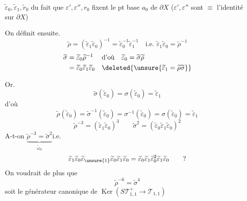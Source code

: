 $\widetilde\varepsilon_0,\widetilde\varepsilon_1,\widetilde r_0$  du fait que $\varepsilon',\varepsilon'',r_0$ fixent le pt base $a_0$ de $\partial X$ ($\varepsilon',\varepsilon''$ sont $\equiv$ l'identité sur $\partial X$)

On définit ensuite.
\[
\widetilde\rho=(\widetilde\varepsilon_1\widetilde\varepsilon_0)^{-1}
=\widetilde\varepsilon_0^{-1}\widetilde\varepsilon_1^{-1}
\quad\text{i.e. }\widetilde\varepsilon_1\widetilde\varepsilon_0=\widetilde\rho^{-1}
\]
\[
\begin{aligned}
\widetilde\sigma&=\widetilde\varepsilon_0\widetilde\rho^{-1}&&\text{d'où}\quad\widetilde\varepsilon_0=\widetilde\sigma\widetilde\rho\\
&=\widetilde\varepsilon_0\widetilde\varepsilon_1\widetilde\varepsilon_0
&&\deleted{\unsure{\widetilde\varepsilon_1=\widetilde\rho\widetilde\sigma}}
\end{aligned}
\]

Or.
\[
\widetilde\sigma(\widetilde\varepsilon_0)=\sigma(\widetilde\varepsilon_0)=\widetilde\varepsilon_1
\]
d'où
\[
\widetilde\rho(\widetilde\varepsilon_0)=\widetilde\sigma^{-1}(\widetilde\varepsilon_0)=\sigma^{-1}(\widetilde\varepsilon_0)=\sigma(\widetilde\varepsilon_0)=\widetilde\varepsilon_1
\]
\[
\widetilde\rho^{-3}=(\widetilde\varepsilon_1\widetilde\varepsilon_0)^3
\qquad\widetilde\sigma^2=(\widetilde\varepsilon_0\widetilde\varepsilon_1\widetilde\varepsilon_0)^2
\]
A-t-on $\underbrace{\widetilde\rho^{-3}=\widetilde\sigma^2}_{\widetilde\omega_0}$\quad i.e.
\[
\widetilde\varepsilon_1\widetilde\varepsilon_0\widetilde\varepsilon_{\unsure{1}}\widetilde\varepsilon_0\widetilde\varepsilon_1\widetilde\varepsilon_0
=\widetilde\varepsilon_0\widetilde\varepsilon_1\widetilde\varepsilon_0^2\widetilde\varepsilon_1\widetilde\varepsilon_0
\qquad ?
\]
On voudrait de plus que
\[
\widetilde\rho^{-6}=\widetilde\sigma^4
\]
soit le générateur canonique de $\operatorname{Ker}(S\mathcal T^+_{1,1}\longrightarrow\mathcal T_{1,1})$

